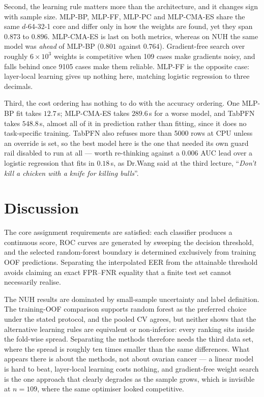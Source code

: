 \documentclass[11pt,a4paper]{article}
\begin{document}
Second, the learning rule matters more than the architecture, and it changes sign with sample size. MLP-BP, MLP-FF, MLP-PC and MLP-CMA-ES share the same $d$-64-32-1 core and differ only in how the weights are found, yet they span $0.873$ to $0.896$. MLP-CMA-ES is last on both metrics, whereas on NUH the same model was \emph{ahead} of MLP-BP ($0.801$ against $0.764$). Gradient-free search over roughly $6\times10^3$ weights is competitive when 109 cases make gradients noisy, and falls behind once 9105 cases make them reliable. MLP-FF is the opposite case: layer-local learning gives up nothing here, matching logistic regression to three decimals.

Third, the cost ordering has nothing to do with the accuracy ordering. One MLP-BP fit takes $12.7$\,s; MLP-CMA-ES takes $289.6$\,s for a worse model, and TabPFN takes $548.8$\,s, almost all of it in prediction rather than fitting, since it does no task-specific training. 
TabPFN also refuses more than 5000 rows at CPU unless an override is set, so the best model here is the one that needed its own guard rail disabled to run at all --- worth re-thinking against a $0.006$ AUC lead over a logistic regression that fits in $0.18$\,s, as Dr.Wang said at the third lecture, ``\emph{Don't kill a chicken with a knife for killing bulls}''.

\section{Discussion}
The core assignment requirements are satisfied: each classifier produces a continuous score, ROC curves are generated by sweeping the decision threshold, and the selected random-forest boundary is determined exclusively from training OOF predictions. Separating the interpolated EER from the attainable threshold avoids claiming an exact FPR--FNR equality that a finite test set cannot necessarily realise.

The NUH results are dominated by small-sample uncertainty and label definition. The training-OOF comparison supports random forest as the preferred choice under the stated protocol, and the pooled CV agrees, but neither shows that the alternative learning rules are equivalent or non-inferior: every ranking sits inside the fold-wise spread. Separating the methods therefore needs the third data set, where the spread is roughly ten times smaller than the same differences. What appears there is about the methods, not about ovarian cancer --- a linear model is hard to beat, layer-local learning costs nothing, and gradient-free weight search is the one approach that clearly degrades as the sample grows, which is invisible at $n=109$, where the same optimiser looked competitive.
\end{document}
